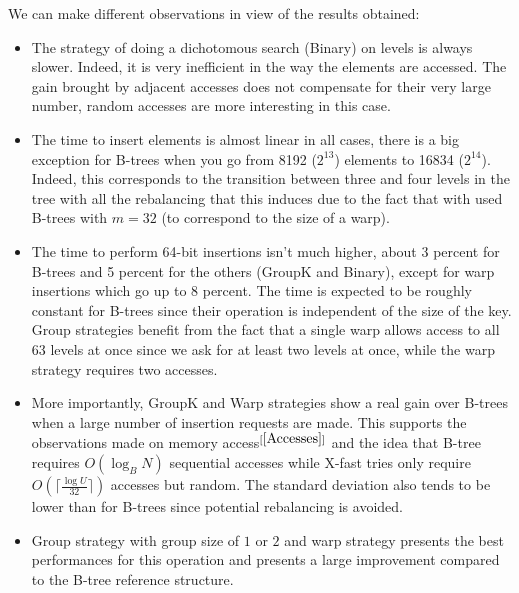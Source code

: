 We can make different observations in view of the results obtained:
\begin{itemize}
    \item The strategy of doing a dichotomous search (Binary) on levels is always slower. Indeed, it is very inefficient in the way the elements are accessed. The gain brought by adjacent accesses does not compensate for their very large number, random accesses are more interesting in this case.
    \item The time to insert elements is almost linear in all cases, there is a big exception for B-trees when you go from 8192 ($2^{13}$) elements to 16834 ($2^{14}$). Indeed, this corresponds to the transition between three and four levels in the tree with all the rebalancing that this induces due to the fact that with used B-trees with $m = 32$ (to correspond to the size of a warp).
    \item The time to perform 64-bit insertions isn't much higher, about 3 percent for B-trees and 5 percent for the others (GroupK and Binary), except for warp insertions which go up to 8 percent. The time is expected to be roughly constant for B-trees since their operation is independent of the size of the key. Group strategies benefit from the fact that a single warp allows access to all 63 levels at once since we ask for at least two levels at once, while the warp strategy requires two accesses.
    \item More importantly, GroupK and Warp strategies show a real gain over B-trees when a large number of insertion requests are made. This supports the observations made on memory access$^{[\ref{Accesses}]}$ and the idea that B-tree requires $O(\log_{B}N)$ sequential accesses while X-fast tries only require $O(\lceil \frac{\log U}{32} \rceil)$ accesses but random. The standard deviation also tends to be lower than for B-trees since potential rebalancing is avoided.
    \item Group strategy with group size of $1$ or $2$ and warp strategy presents the best performances for this operation and presents a large improvement compared to the B-tree reference structure.
\end{itemize}

